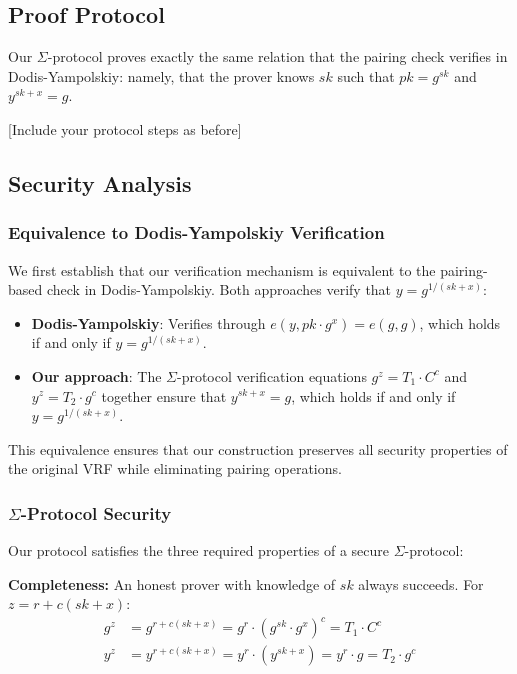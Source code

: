 \subsection{Proof Protocol}
Our $\Sigma$-protocol proves exactly the same relation that the pairing check verifies in Dodis-Yampolskiy: namely, that the prover knows $sk$ such that $pk = g^{sk}$ and $y^{sk+x} = g$.

[Include your protocol steps as before]

\subsection{Security Analysis}

\subsubsection{Equivalence to Dodis-Yampolskiy Verification}
We first establish that our verification mechanism is equivalent to the pairing-based check in Dodis-Yampolskiy. Both approaches verify that $y = g^{1/(sk+x)}$:

\begin{itemize}
    \item \textbf{Dodis-Yampolskiy}: Verifies through $e(y, pk \cdot g^x) = e(g, g)$, which holds if and only if $y = g^{1/(sk+x)}$.
    
    \item \textbf{Our approach}: The $\Sigma$-protocol verification equations $g^z = T_1 \cdot C^c$ and $y^z = T_2 \cdot g^c$ together ensure that $y^{sk+x} = g$, which holds if and only if $y = g^{1/(sk+x)}$.
\end{itemize}

This equivalence ensures that our construction preserves all security properties of the original VRF while eliminating pairing operations.

\subsubsection{$\Sigma$-Protocol Security}
Our protocol satisfies the three required properties of a secure $\Sigma$-protocol:

\textbf{Completeness:} An honest prover with knowledge of $sk$ always succeeds. For $z = r + c(sk+x)$:
\begin{align}
g^z &= g^{r + c(sk+x)} = g^r \cdot (g^{sk} \cdot g^x)^c = T_1 \cdot C^c\\
y^z &= y^{r + c(sk+x)} = y^r \cdot (y^{sk+x}) = y^r \cdot g = T_2 \cdot g^c
\end{align}

